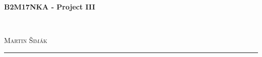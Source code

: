 \documentclass[11pt,a4paper]{article}
\begin{document}

    \begin{center}
        {\LARGE\textbf{B2M17NKA - Project III}}\\[3mm]
        \begin{minipage}{0.4\textwidth}
            \begin{flushleft}
                \textsc{}
            \end{flushleft}
        \end{minipage}
        ~
        \begin{minipage}{0.4\textwidth}
            \begin{flushright}
                \textsc{Martin Šimák}
            \end{flushright}
        \end{minipage}
        \noindent\rule{14.5cm}{0.4pt}
    \end{center}
\end{document}
